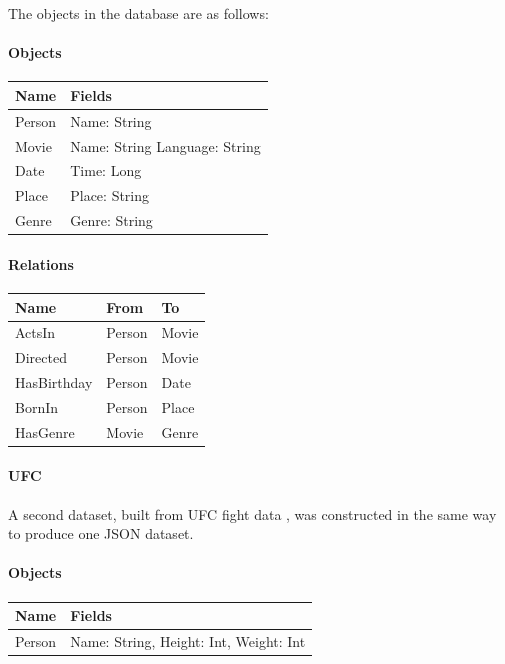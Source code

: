 \documentclass[12pt,a4paper,twoside,openright]{report}
\begin{document}
The objects in the database are as follows:
\paragraph{Objects}
\begin{center}
	\begin{tabular}{ |p{3cm}| p{3cm}|}
	\hline
	Name & Fields \\ \hline
	Person & Name: String \\ \hline
	Movie & Name: String Language: String \\ \hline
	Date & Time: Long \\ \hline
	Place & Place: String \\ \hline
	Genre &	Genre: String \\ \hline
	\end{tabular}
\end{center}

\paragraph{Relations}
\begin{center}
	\begin{tabular}{ |p{3cm}|| p{3cm}| p{3cm}|}
	\hline
		Name &  From & To \\ \hline
		ActsIn & Person & Movie \\ \hline
		Directed & Person & Movie\\ \hline
		HasBirthday &Person & Date\\ \hline
		BornIn & Person & Place\\ \hline
		HasGenre & Movie & Genre\\ \hline
	\end{tabular}
\end{center}

		\paragraph{UFC}
		
		A second dataset, built from UFC fight data \cite{UFC}, was constructed in the same way to produce one JSON dataset.
		
		\paragraph{Objects}
\begin{center}
	\begin{tabular}{ |p{3cm}| p{9cm}|}
	\hline
		Name & Fields \\ \hline
		Person & Name: String, Height: Int, Weight: Int\\ \hline
	\end{tabular}
\end{center}
\end{document}
